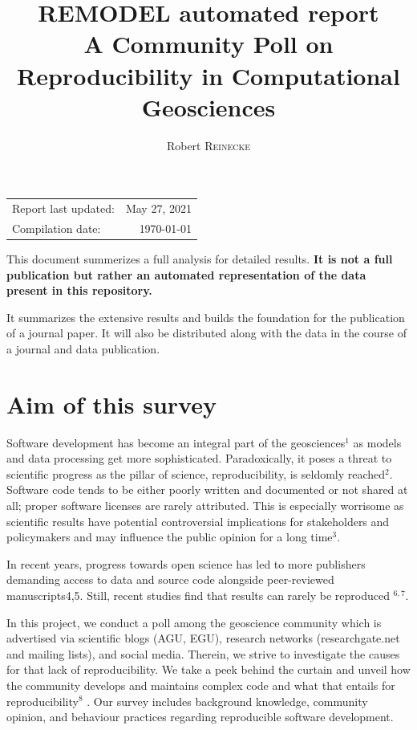 \documentclass{article}
\title{\textbf{REMODEL automated report} \\ A Community Poll on Reproducibility in Computational Geosciences} %
\author{Robert \textsc{Reinecke}} %
\begin{document}
\maketitle %

\begin{center}
\begin{tabular}{l r}
Report last updated: & May 27, 2021\\
Compilation date: & \today
\end{tabular}
\end{center}

This document summerizes a full analysis for detailed results. \textbf{It is not a full publication but rather an automated representation of the data present in this repository.}

It summarizes the extensive results and builds the foundation for the publication of a journal paper.
It will also be distributed along with the data in the course of a journal and data publication.

\thispagestyle{empty}

\tableofcontents
\listoffigures

\newpage

\section{Aim of this survey}
Software development has become an integral part of the geosciences$^{1}$ as models and data processing get more sophisticated.
Paradoxically, it poses a threat to scientific progress as the pillar of science, reproducibility, is seldomly reached$^{2}$.
Software code tends to be either poorly written and documented or not shared at all; proper software licenses are rarely attributed.
This is especially worrisome as scientific results have potential controversial implications for stakeholders and policymakers and may influence the public opinion for a long time$^{3}$.

In recent years, progress towards open science has led to more publishers demanding access to data and source code alongside peer-reviewed manuscripts4,5. Still, recent studies find that results can rarely be reproduced $^{6,7}$.

In this project, we conduct a poll among the geoscience community which is advertised via scientific blogs (AGU, EGU), research networks (researchgate.net and mailing lists), and social media.
Therein, we strive to investigate the causes for that lack of reproducibility.
We take a peek behind the curtain and unveil how the community develops and maintains complex code and what that entails for reproducibility$^{8}$ .
Our survey includes background knowledge, community opinion, and behaviour practices regarding reproducible software development.
\end{document}
